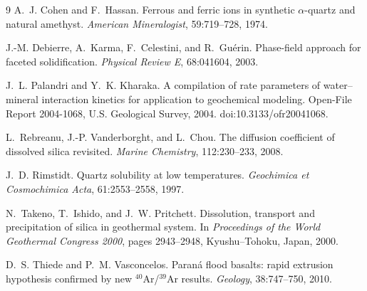 \documentclass[11pt,a4paper]{article}
\begin{document}

\begin{thebibliography}{9}
A.~J. Cohen and F.~Hassan.
\newblock Ferrous and ferric ions in synthetic $\alpha$-quartz and natural amethyst.
\newblock \emph{American Mineralogist}, 59:719--728, 1974.

J.-M. Debierre, A.~Karma, F.~Celestini, and R.~Guérin.
\newblock Phase-field approach for faceted solidification.
\newblock \emph{Physical Review E}, 68:041604, 2003.

J.~L. Palandri and Y.~K. Kharaka.
\newblock A compilation of rate parameters of water--mineral interaction kinetics for application to geochemical modeling.
\newblock Open-File Report 2004-1068, U.S. Geological Survey, 2004. doi:10.3133/ofr20041068.

L.~Rebreanu, J.-P. Vanderborght, and L.~Chou.
\newblock The diffusion coefficient of dissolved silica revisited.
\newblock \emph{Marine Chemistry}, 112:230--233, 2008.

J.~D. Rimstidt.
\newblock Quartz solubility at low temperatures.
\newblock \emph{Geochimica et Cosmochimica Acta}, 61:2553--2558, 1997.

N.~Takeno, T.~Ishido, and J.~W. Pritchett.
\newblock Dissolution, transport and precipitation of silica in geothermal system.
\newblock In \emph{Proceedings of the World Geothermal Congress 2000}, pages 2943--2948, Kyushu--Tohoku, Japan, 2000.

D.~S. Thiede and P.~M. Vasconcelos.
\newblock Paraná flood basalts: rapid extrusion hypothesis confirmed by new $^{40}$Ar/$^{39}$Ar results.
\newblock \emph{Geology}, 38:747--750, 2010.
\end{thebibliography}
\end{document}
